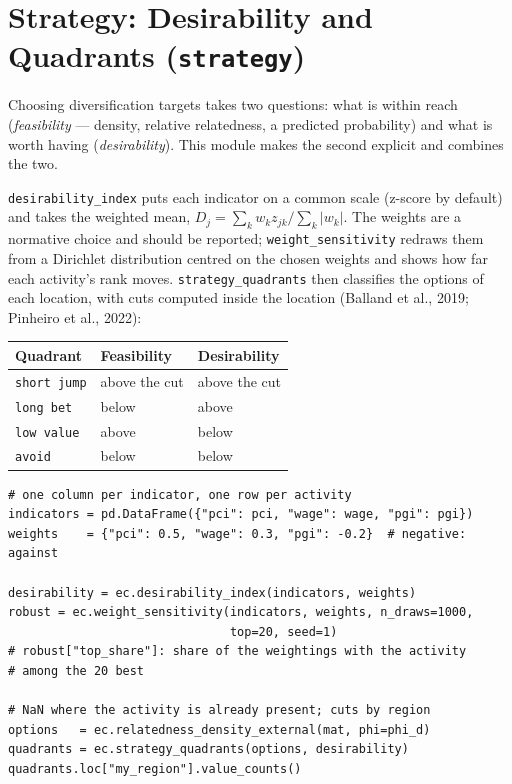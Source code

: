 \documentclass[12pt, a4paper]{article}
\newcommand{\fn}[1]{\texttt{#1}}
\begin{document}
\section{Strategy: Desirability and Quadrants (\texttt{strategy})}

Choosing diversification targets takes two questions: what is within
reach (\emph{feasibility} --- density, relative relatedness, a predicted
probability) and what is worth having (\emph{desirability}). This module
makes the second explicit and combines the two.

\fn{desirability\_index} puts each indicator on a common scale (z-score
by default) and takes the weighted mean,
$D_j = \sum_k w_k z_{jk} / \sum_k |w_k|$. The weights are a normative
choice and should be reported; \fn{weight\_sensitivity} redraws them from
a Dirichlet distribution centred on the chosen weights and shows how far
each activity's rank moves. \fn{strategy\_quadrants} then classifies the
options of each location, with cuts computed inside the location
(Balland et al., 2019; Pinheiro et al., 2022):

\begin{center}
\small
\begin{tabular}{lll}
\toprule
\textbf{Quadrant} & \textbf{Feasibility} & \textbf{Desirability} \\
\midrule
\texttt{short jump} & above the cut & above the cut \\
\texttt{long bet}   & below         & above \\
\texttt{low value}  & above         & below \\
\texttt{avoid}      & below         & below \\
\bottomrule
\end{tabular}
\end{center}

\begin{lstlisting}[caption={Desirability, sensitivity to the weights and quadrants}]
# one column per indicator, one row per activity
indicators = pd.DataFrame({"pci": pci, "wage": wage, "pgi": pgi})
weights    = {"pci": 0.5, "wage": 0.3, "pgi": -0.2}  # negative: against

desirability = ec.desirability_index(indicators, weights)
robust = ec.weight_sensitivity(indicators, weights, n_draws=1000,
                               top=20, seed=1)
# robust["top_share"]: share of the weightings with the activity
# among the 20 best

# NaN where the activity is already present; cuts by region
options   = ec.relatedness_density_external(mat, phi=phi_d)
quadrants = ec.strategy_quadrants(options, desirability)
quadrants.loc["my_region"].value_counts()
\end{lstlisting}
\end{document}
